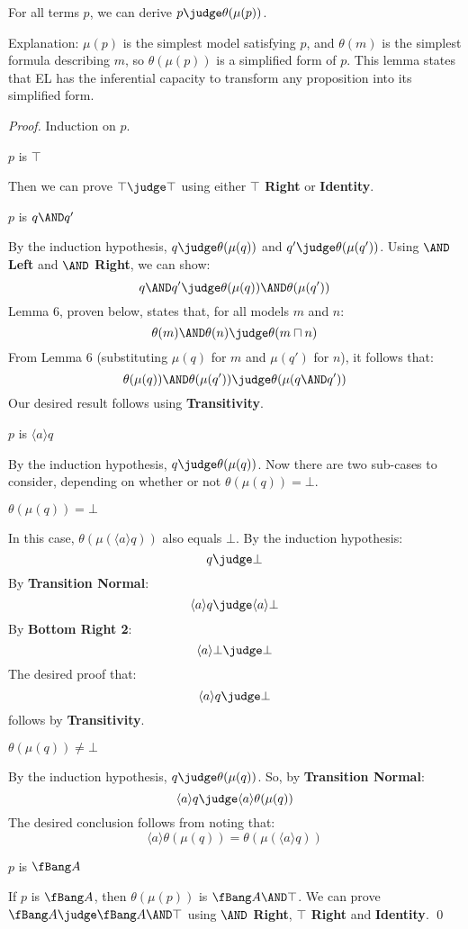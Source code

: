 \begin{lemma}
\label{second_completeness_lemma}
For all terms $p$, we can derive $p \judge \theta(\mu(p))$.
\end{lemma}
Explanation: $\mu(p)$ is the simplest model satisfying $p$, and $\theta(m)$ is the simplest formula describing $m$, so $\theta(\mu(p))$ is a simplified form of $p$. This lemma states that EL has the inferential capacity to transform any proposition into its simplified form.
\begin{proof}
Induction on $p$.

\setcounter{mycase}{0}

\begin{mycase}
$p$ is $\top$
\end{mycase}
Then we can prove  $\top \judge \top$ using either {\bf $\top$ Right} or {\bf Identity}.

\begin{mycase}
$p$ is $q \AND q'$
\end{mycase}
By the induction hypothesis, $q \judge \theta(\mu(q))$ and $q' \judge \theta(\mu(q'))$.
Using {\bf $\AND$ Left} and {\bf $\AND$ Right}, we can show:
\[
q \AND q' \judge \theta(\mu(q)) \AND \theta(\mu(q'))
\]
Lemma 6, proven below, states that, for all models $m$ and $n$:
\[
\theta(m) \AND \theta(n) \judge \theta (m \sqcap n)
\]
From Lemma 6 (substituting $\mu(q)$ for $m$ and $\mu(q')$ for $n$), it follows that:
\[
\theta(\mu(q)) \AND \theta(\mu(q')) \judge \theta(\mu(q \AND q'))
\]
Our desired result follows using {\bf Transitivity}.

\begin{mycase}
$p$ is $\langle a \rangle q$
\end{mycase}
By the induction hypothesis, $q \judge \theta(\mu(q))$.
Now there are two sub-cases to consider, depending on whether or not $\theta(\mu(q)) = \bot$.
\begin{subcase}
$\theta(\mu(q)) = \bot$
\end{subcase}
In this case, $\theta(\mu(\langle a \rangle q))$ also equals $\bot$. 
By the induction hypothesis:
\[
q \judge \bot
\]
By {\bf Transition Normal}:
\[
\langle a \rangle q \judge \langle a \rangle \bot
\]
By {\bf Bottom Right 2}:
\[
\langle a \rangle \bot \judge \bot
\]
The desired proof that:
\[
\langle a \rangle q \judge \bot
\]
follows by {\bf Transitivity}.
\begin{subcase}
$\theta(\mu(q)) \neq \bot$
\end{subcase}
By the induction hypothesis, $q \judge \theta(\mu(q))$.
So, by {\bf Transition Normal}:
\[
\langle a \rangle q \judge \langle a \rangle \theta(\mu(q))
\]
The desired conclusion follows from noting that:
\[
 \langle a \rangle \theta(\mu(q)) = \theta(\mu(\langle a \rangle q))
 \]
 \begin{mycase}
$p$ is $\fBang A$
\end{mycase}
If $p$ is $\fBang A$, then $ \theta(\mu(p))$ is $\fBang A \AND \top$.
We can prove $\fBang A \judge \fBang A \AND \top$ using {\bf $\AND$ Right}, {\bf $\top$ Right} and {\bf Identity}.
\qed
\end{proof}
